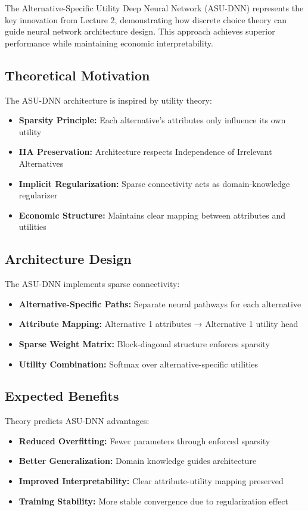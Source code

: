 \documentclass[11pt]{article}
\begin{document}
The Alternative-Specific Utility Deep Neural Network (ASU-DNN) represents the key innovation from Lecture 2, demonstrating how discrete choice theory can guide neural network architecture design. This approach achieves superior performance while maintaining economic interpretability.

\subsection*{Theoretical Motivation}

The ASU-DNN architecture is inspired by utility theory:
\begin{itemize}
\item \textbf{Sparsity Principle:} Each alternative's attributes only influence its own utility
\item \textbf{IIA Preservation:} Architecture respects Independence of Irrelevant Alternatives
\item \textbf{Implicit Regularization:} Sparse connectivity acts as domain-knowledge regularizer
\item \textbf{Economic Structure:} Maintains clear mapping between attributes and utilities
\end{itemize}

\subsection*{Architecture Design}

The ASU-DNN implements sparse connectivity:
\begin{itemize}
\item \textbf{Alternative-Specific Paths:} Separate neural pathways for each alternative
\item \textbf{Attribute Mapping:} Alternative 1 attributes → Alternative 1 utility head
\item \textbf{Sparse Weight Matrix:} Block-diagonal structure enforces sparsity
\item \textbf{Utility Combination:} Softmax over alternative-specific utilities
\end{itemize}

\subsection*{Expected Benefits}

Theory predicts ASU-DNN advantages:
\begin{itemize}
\item \textbf{Reduced Overfitting:} Fewer parameters through enforced sparsity
\item \textbf{Better Generalization:} Domain knowledge guides architecture
\item \textbf{Improved Interpretability:} Clear attribute-utility mapping preserved
\item \textbf{Training Stability:} More stable convergence due to regularization effect
\end{itemize}
\end{document}
